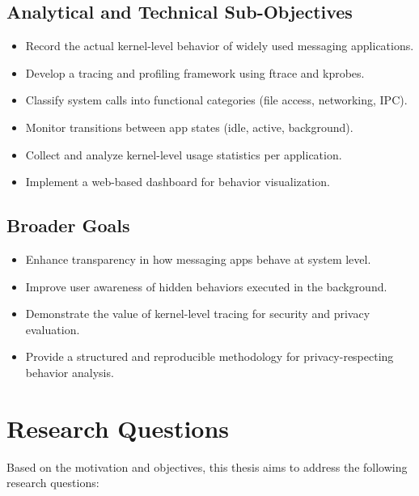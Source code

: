 \documentclass[a4paper,12pt]{report}
\begin{document}
\subsection*{Analytical and Technical Sub-Objectives}
\begin{itemize}
\item Record the actual kernel-level behavior of widely used messaging applications.
\item Develop a tracing and profiling framework using ftrace and kprobes.
\item Classify system calls into functional categories (file access, networking, IPC).
\item Monitor transitions between app states (idle, active, background).
\item Collect and analyze kernel-level usage statistics per application.
\item Implement a web-based dashboard for behavior visualization.
\end{itemize}

\subsection*{Broader Goals}
\begin{itemize}
\item Enhance transparency in how messaging apps behave at system level.
\item Improve user awareness of hidden behaviors executed in the background.
\item Demonstrate the value of kernel-level tracing for security and privacy evaluation.
\item Provide a structured and reproducible methodology for privacy-respecting
behavior analysis.
\end{itemize}

\section{Research Questions}
Based on the motivation and objectives, this thesis aims to address the following
research questions:

\vspace{0.5em}
\noindent{}

\vspace{0.5em}
\noindent{}
\end{document}
